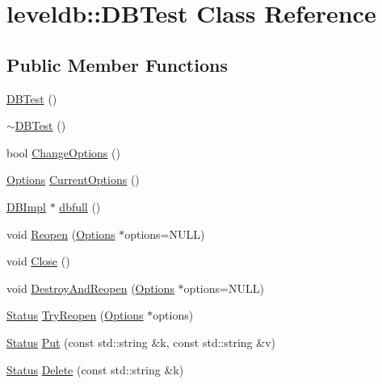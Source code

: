 \hypertarget{classleveldb_1_1_d_b_test}{}\section{leveldb\+:\+:D\+B\+Test Class Reference}
\label{classleveldb_1_1_d_b_test}
\subsection*{Public Member Functions}
\begin{DoxyCompactItemize}
\item 
\hyperlink{classleveldb_1_1_d_b_test_afc6fc9512e900de6ee10c5db15b22930}{D\+B\+Test} ()
\item 
\hyperlink{classleveldb_1_1_d_b_test_a2268045d59c3a74bba03877819e36b55}{$\sim$\+D\+B\+Test} ()
\item 
bool \hyperlink{classleveldb_1_1_d_b_test_a587534fe403016f15cf1997ef7a40836}{Change\+Options} ()
\item 
\hyperlink{structleveldb_1_1_options}{Options} \hyperlink{classleveldb_1_1_d_b_test_a68db410e16195a3b67822bec05c06547}{Current\+Options} ()
\item 
\hyperlink{classleveldb_1_1_d_b_impl}{D\+B\+Impl} $\ast$ \hyperlink{classleveldb_1_1_d_b_test_a67de35d247ea077c1e4fdf2a7a0f0514}{dbfull} ()
\item 
void \hyperlink{classleveldb_1_1_d_b_test_a38170a082cbc71fb446408ff5634c797}{Reopen} (\hyperlink{structleveldb_1_1_options}{Options} $\ast$options=N\+U\+L\+L)
\item 
void \hyperlink{classleveldb_1_1_d_b_test_aee76446bbb9c34cdb1ae00318689aead}{Close} ()
\item 
void \hyperlink{classleveldb_1_1_d_b_test_ab798a43e7feab6dddc8fa1eb7a5f61f6}{Destroy\+And\+Reopen} (\hyperlink{structleveldb_1_1_options}{Options} $\ast$options=N\+U\+L\+L)
\item 
\hyperlink{classleveldb_1_1_status}{Status} \hyperlink{classleveldb_1_1_d_b_test_aee588b2d13db6be2a651a8fabeac5c79}{Try\+Reopen} (\hyperlink{structleveldb_1_1_options}{Options} $\ast$options)
\item 
\hyperlink{classleveldb_1_1_status}{Status} \hyperlink{classleveldb_1_1_d_b_test_a5ec1a1d5ecc1744f325159eb81e46514}{Put} (const std\+::string \&k, const std\+::string \&v)
\item 
\hyperlink{classleveldb_1_1_status}{Status} \hyperlink{classleveldb_1_1_d_b_test_a25716ec93d525adbeea8ff71e8f3a9f4}{Delete} (const std\+::string \&k)

\end{DoxyCompactItemize}
